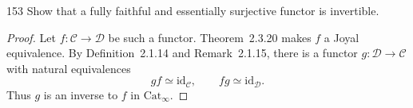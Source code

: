 \begin{exercise}{153}
Show that a fully faithful and essentially surjective functor is invertible.

\begin{proof}
Let $f\colon\mathcal{C}\to\mathcal{D}$ be such a functor.
Theorem~2.3.20 makes $f$ a Joyal equivalence.
By Definition~2.1.14 and Remark~2.1.15, there is a functor
$g\colon\mathcal{D}\to\mathcal{C}$ with natural equivalences
\[
 gf\simeq\mathrm{id}_{\mathcal{C}},\qquad
 fg\simeq\mathrm{id}_{\mathcal{D}}.
\]
Thus $g$ is an inverse to $f$ in $\mathrm{Cat}_\infty$.
\end{proof}
\end{exercise}
